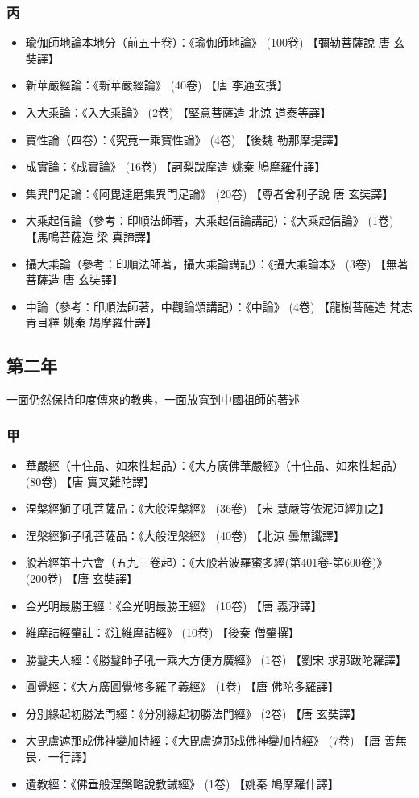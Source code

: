 \subsubsection{丙}
\begin{itemize}
  \item 瑜伽師地論本地分（前五十卷）：《瑜伽師地論》 (100卷) 【彌勒菩薩說 唐 玄奘譯】
  \item 新華嚴經論：《新華嚴經論》 (40卷) 【唐 李通玄撰】
  \item 入大乘論：《入大乘論》 (2卷) 【堅意菩薩造 北涼 道泰等譯】
  \item 寶性論（四卷）：《究竟一乘寶性論》 (4卷) 【後魏 勒那摩提譯】
  \item 成實論：《成實論》 (16卷) 【訶梨跋摩造 姚秦 鳩摩羅什譯】
  \item 集異門足論：《阿毘達磨集異門足論》 (20卷) 【尊者舍利子說 唐 玄奘譯】
  \item 大乘起信論（參考：印順法師著，大乘起信論講記）：《大乘起信論》 (1卷) 【馬鳴菩薩造 梁 真諦譯】
  \item 攝大乘論（參考：印順法師著，攝大乘論講記）：《攝大乘論本》 (3卷) 【無著菩薩造 唐 玄奘譯】
  \item 中論（參考：印順法師著，中觀論頌講記）：《中論》 (4卷) 【龍樹菩薩造 梵志青目釋 姚秦 鳩摩羅什譯】
\end{itemize}
\subsection{第二年}
一面仍然保持印度傳來的教典，一面放寬到中國祖師的著述
\subsubsection{甲}
\begin{itemize}
  \item 華嚴經（十住品、如來性起品）：《大方廣佛華嚴經》（十住品、如來性起品） (80卷) 【唐 實叉難陀譯】
  \item 涅槃經獅子吼菩薩品：《大般涅槃經》 (36卷) 【宋 慧嚴等依泥洹經加之】
  \item 涅槃經獅子吼菩薩品：《大般涅槃經》 (40卷) 【北涼 曇無讖譯】
  \item 般若經第十六會（五九三卷起）：《大般若波羅蜜多經(第401卷-第600卷)》 (200卷) 【唐 玄奘譯】
  \item 金光明最勝王經：《金光明最勝王經》 (10卷) 【唐 義淨譯】
  \item 維摩詰經肇註：《注維摩詰經》 (10卷) 【後秦 僧肇撰】
  \item 勝鬘夫人經：《勝鬘師子吼一乘大方便方廣經》 (1卷) 【劉宋 求那跋陀羅譯】
  \item 圓覺經：《大方廣圓覺修多羅了義經》 (1卷) 【唐 佛陀多羅譯】
  \item 分別緣起初勝法門經：《分別緣起初勝法門經》 (2卷) 【唐 玄奘譯】
  \item 大毘盧遮那成佛神變加持經：《大毘盧遮那成佛神變加持經》 (7卷) 【唐 善無畏．一行譯】
  \item 遺教經：《佛垂般涅槃略說教誡經》 (1卷) 【姚秦 鳩摩羅什譯】
\end{itemize}
